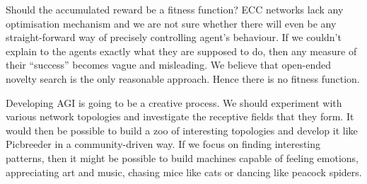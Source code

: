 \documentclass[12pt]{article}
\begin{document}
Should the accumulated reward be a fitness function? ECC networks lack any optimisation  mechanism and we are not sure whether there will even be any straight-forward way of precisely controlling agent's behaviour. If we couldn't explain to the agents exactly what they are supposed to do, then any measure of their ``success'' becomes vague and misleading. We believe that open-ended novelty search is the only reasonable approach. Hence there is no fitness function.

Developing AGI is going to be a creative process. We should experiment with various network topologies and investigate the receptive fields that they form. 
It would then be possible to build a zoo of interesting topologies and develop it like Picbreeder in a community-driven way. If we focus on finding interesting patterns, then it might be possible to build machines capable of feeling emotions, appreciating art and music, chasing mice like cats or dancing like peacock spiders.




 



    
\end{document}
